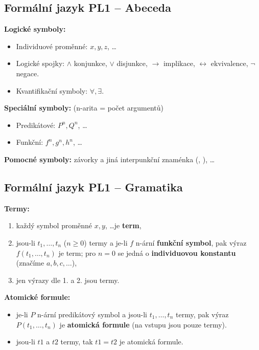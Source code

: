 \subsection{Formální jazyk PL1 -- Abeceda}
\textbf{Logické symboly:}
\begin{itemize}
    \item Individuové proměnné: $x, y, z$, \ldots
    \item Logické spojky:  $\land$ konjunkce, $\lor$ disjunkce, $ \rightarrow $ implikace,  $ \leftrightarrow $ ekvivalence, $ \lnot $ negace.
    \item Kvantifikační symboly: $\forall, \exists$.
\end{itemize}

\noindent\textbf{Speciální symboly:} (n-arita = počet argumentů)
\begin{itemize}
    \item Predikátové: $P^n, Q^n$, \ldots
    \item Funkční: $f^n, g^n, h^n$, \ldots
\end{itemize}

\noindent\textbf{Pomocné symboly:} závorky a jiná interpunkční znaménka (, ), \ldots

\subsection{Formální jazyk PL1 -- Gramatika}
\textbf{Termy:}
\begin{enumerate}
    \item každý symbol proměnné $x, y$, \ldots je \textbf{term},
    \item jsou-li $ t_1, \ldots, t_n $ ($n \geq 0$) termy a je-li $f$ n-ární \textbf{funkční symbol}, pak výraz $f(t_1, \ldots, t_n)$ je term; pro $n = 0$ se jedná o \textbf{individuovou konstantu} (značíme $a, b, c, \ldots$),
    \item jen výrazy dle 1. a 2. jsou termy.
\end{enumerate}

\noindent\textbf{Atomické formule:}
\begin{itemize}
    \item je-li $ P $ n-ární predikátový symbol a jsou-li $ t_1, \ldots, t_n $ termy, pak výraz $ P(t_1, \ldots, t_n) $ je \textbf{atomická formule} (na vstupu jsou pouze termy).
    \item jsou-li $t1$ a $t2$ termy, tak $t1 = t2$ je atomická formule.
\end{itemize}

